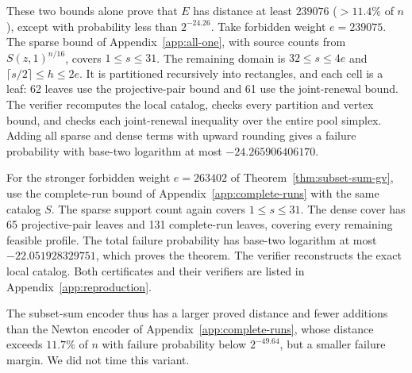 These two bounds alone prove that $E$ has distance at least $239076$
($>11.4\%$ of $n$), except with probability less than $2^{-24.26}$.
Take forbidden weight $e=239075$. The sparse bound of
Appendix~\ref{app:all-one}, with source counts from $S(z,1)^{n/16}$,
covers $1\le s\le31$. The remaining domain is
$32\le s\le4e$ and $\lceil s/2\rceil\le h\le2e$. It is partitioned
recursively into rectangles, and each cell is a leaf: 62 leaves use
the projective-pair bound and 61 use the joint-renewal bound. The
verifier recomputes the local catalog, checks every partition and
vertex bound, and checks each joint-renewal inequality over the entire
pool simplex. Adding all sparse and dense terms with upward rounding
gives a failure probability with base-two logarithm at most
$-24.265906406170$.

For the stronger forbidden weight $e=263402$ of
Theorem~\ref{thm:subset-sum-gv}, use the complete-run bound
of Appendix~\ref{app:complete-runs} with the same catalog $S$.
The sparse support count again covers $1\le s\le31$. The dense cover
has 65 projective-pair leaves and 131 complete-run leaves, covering
every remaining feasible profile. The total failure probability has
base-two logarithm at most $-22.051928329751$, which proves the theorem.
The verifier reconstructs the exact local catalog. Both certificates
and their verifiers are listed in Appendix~\ref{app:reproduction}.

The subset-sum encoder thus has a larger proved distance and fewer
additions than the Newton encoder of Appendix~\ref{app:complete-runs},
whose distance exceeds $11.7\%$ of $n$ with failure probability below
$2^{-49.64}$, but a smaller failure margin. We did not time this variant.
